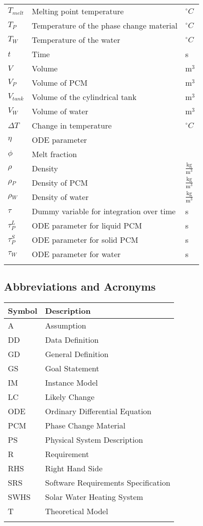\documentclass[12pt]{article}
\begin{document}
\begin{longtable*}{l l l}
$T_{melt}$ & Melting point temperature & ${}^{\circ}C$
\\
$T_{P}$ & Temperature of the phase change material & ${}^{\circ}C$
\\
$T_{W}$ & Temperature of the water & ${}^{\circ}C$
\\
$t$ & Time & s
\\
$V$ & Volume & $\text{m}^{3}$
\\
$V_{P}$ & Volume of PCM & $\text{m}^{3}$
\\
$V_{tank}$ & Volume of the cylindrical tank & $\text{m}^{3}$
\\
$V_{W}$ & Volume of water & $\text{m}^{3}$
\\
$\Delta{}T$ & Change in temperature & ${}^{\circ}C$
\\
$\eta{}$ & ODE parameter & 
\\
$\phi{}$ & Melt fraction & 
\\
$\rho{}$ & Density & $\frac{\text{kg}}{\text{m}^{3}}$
\\
$\rho{}_{P}$ & Density of PCM & $\frac{\text{kg}}{\text{m}^{3}}$
\\
$\rho{}_{W}$ & Density of water & $\frac{\text{kg}}{\text{m}^{3}}$
\\
$\tau{}$ & Dummy variable for integration over time & s
\\
$\tau{}_{P}^{L}$ & ODE parameter for liquid PCM & s
\\
$\tau{}_{P}^{S}$ & ODE parameter for solid PCM & s
\\
$\tau{}_{W}$ & ODE parameter for water & s
\\
\bottomrule
\label{Table:TablofSymb}
\end{longtable*}
\subsection{Abbreviations and Acronyms}
\label{Sec:AbbrandAcro}
\begin{longtable*}{l l}
\toprule
Symbol & Description
\\
\midrule
A & Assumption
\\
DD & Data Definition
\\
GD & General Definition
\\
GS & Goal Statement
\\
IM & Instance Model
\\
LC & Likely Change
\\
ODE & Ordinary Differential Equation
\\
PCM & Phase Change Material
\\
PS & Physical System Description
\\
R & Requirement
\\
RHS & Right Hand Side
\\
SRS & Software Requirements Specification
\\
SWHS & Solar Water Heating System
\\
T & Theoretical Model
\\
\bottomrule
\label{Table:AbbrandAcro}
\end{longtable*}
\end{document}
